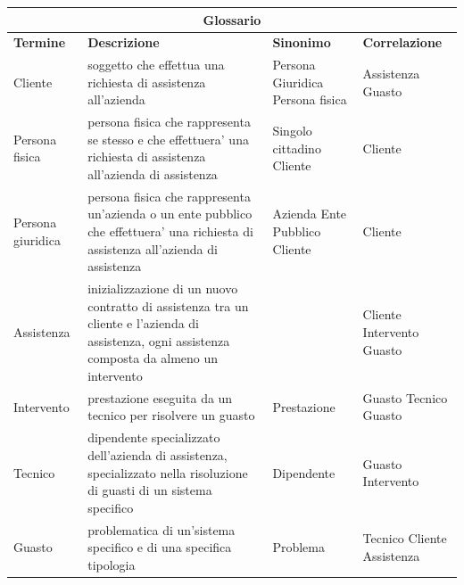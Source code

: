 \documentclass[legalpaper]{article}
\begin{document}
\begin{tabular}{ |p{1.5cm}|p{8cm}|p{3cm}|p{2.5cm}| }
\hline
\multicolumn{4}{|c|}{\textbf{Glossario}} \\
\hline
\textbf{Termine} & \textbf{Descrizione} & \textbf{Sinonimo} & \textbf{Correlazione} \\
\hline
Cliente &  soggetto che effettua una richiesta di assistenza all'azienda & Persona Giuridica \newline Persona fisica & Assistenza \newline Guasto \\ \hline

Persona fisica &  persona fisica che rappresenta se stesso e che effettuera' una richiesta di assistenza all'azienda di assistenza &  Singolo cittadino \newline Cliente &  Cliente \\ \hline

Persona giuridica &  persona fisica che rappresenta un'azienda o un ente pubblico che effettuera' una richiesta di assistenza all'azienda di assistenza & Azienda \newline Ente Pubblico \newline Cliente &  Cliente \\ \hline

Assistenza & inizializzazione di un nuovo contratto di assistenza tra un cliente e l'azienda di assistenza, ogni assistenza composta da almeno un intervento   &  & Cliente \newline Intervento \newline Guasto \\ \hline

Intervento & prestazione eseguita da un tecnico per risolvere un guasto & Prestazione & Guasto \newline Tecnico \newline Guasto \\ \hline

Tecnico  & dipendente specializzato dell'azienda di assistenza, specializzato nella risoluzione di guasti di un sistema specifico & Dipendente & Guasto \newline Intervento \\ \hline

Guasto  & problematica di un'sistema specifico e di una specifica tipologia  & Problema &  Tecnico  \newline Cliente \newline Assistenza \\ \hline

\end{tabular}
\end{document}
